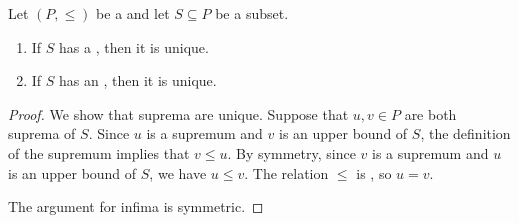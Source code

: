 \begin{lemma} \label{lemma:supremum_infimum_of_a_subset_of_an_ordered_set_is_unique_if_exists}
Let $(P, \leq)$ be a  and let $S \subseteq P$ be a subset.
\begin{enumerate}
    \item If $S$ has a , then it is unique.
    \item If $S$ has an , then it is unique.
\end{enumerate}
\end{lemma}
\begin{proof}
    We show that suprema are unique. Suppose that $u, v \in P$ are both suprema of $S$. Since $u$ is a supremum and $v$ is an upper bound of $S$, the definition of the supremum implies that $v \leq u$. By symmetry, since $v$ is a supremum and $u$ is an upper bound of $S$, we have $u \leq v$. The relation $\leq$ is , so $u = v$.

    The argument for infima is symmetric.
\end{proof}
